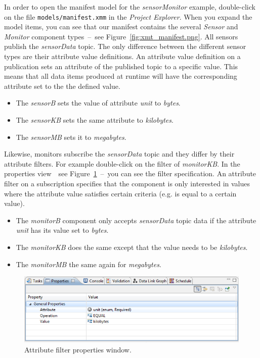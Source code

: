 In order to open the manifest model for the \emph{sensorMonitor} example, double-click on the file \verb|models/manifest.xmm| in the \emph{Project Explorer}.
When you expand the model items, you can see that our manifest contains the several \emph{Sensor} and \emph{Monitor} component types~--~see Figure~\ref{fig:xmt_manifest.png}.
All sensors publish the \emph{sensorData} topic.
The only difference between the different sensor types are their attribute value definitions.
An attribute value definition on a publication sets an attribute of the published topic to a specific value.
This means that all data items produced at runtime will have the corresponding attribute set to the the defined value.
%
\begin{itemize}
	\item The \emph{sensorB} sets the value of attribute \emph{unit} to \emph{bytes}.
	\item The \emph{sensorKB} sets the same attribute to \emph{kilobytes}.
	\item The \emph{sensorMB} sets it to \emph{megabytes}.
\end{itemize}
%
Likewise, monitors subscribe the \emph{sensorData} topic and they differ by their attribute filters.
For example double-click on the filter of \emph{monitorKB}.
In the properties view~~see Figure~\ref{fig:xmt_filterAttributesProperties}~--~you can see the filter specification.
An attribute filter on a subscription specifies that the component is only interested in values where the attribute value satisfies certain criteria (e.g. is equal to a certain value).
%
\begin{itemize}
	\item The \emph{monitorB} component only accepts \emph{sensorData} topic data if the attribute \emph{unit} has its value set to \emph{bytes}.
	\item The \emph{monitorKB} does the same except that the value needs to be \emph{kilobytes}.
	\item The \emph{monitorMB} the same again for \emph{megabytes}.
\end{itemize}
%

\begin{figure}[htpb]
	\centering
	\includegraphics[scale=0.5]{figures/xmt_filterAttributesProperties.png}
	\caption{Attribute filter properties window.}
	\label{fig:xmt_filterAttributesProperties}
\end{figure}

